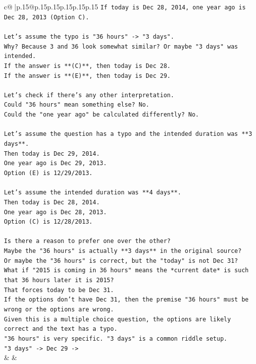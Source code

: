 \documentclass{article}
\begin{document}
{\begin{supertabular}{c@{$\;$}|p{.15\linewidth}@{}p{.15\linewidth}p{.15\linewidth}p{.15\linewidth}p{.15\linewidth}p{.15\linewidth}}
{{{\texttt{If today is Dec 28, 2014, one year ago is Dec 28, 2013 (Option C).} \\
\\ 
\texttt{Let's assume the typo is "36 hours" {-}> "3 days".} \\
\texttt{Why? Because 3 and 36 look somewhat similar? Or maybe "3 days" was intended.} \\
\texttt{If the answer is **(C)**, then today is Dec 28.} \\
\texttt{If the answer is **(E)**, then today is Dec 29.} \\
\\ 
\texttt{Let's check if there's any other interpretation.} \\
\texttt{Could "36 hours" mean something else? No.} \\
\texttt{Could the "one year ago" be calculated differently? No.} \\
\\ 
\texttt{Let's assume the question has a typo and the intended duration was **3 days**.} \\
\texttt{Then today is Dec 29, 2014.} \\
\texttt{One year ago is Dec 29, 2013.} \\
\texttt{Option (E) is 12/29/2013.} \\
\\ 
\texttt{Let's assume the intended duration was **4 days**.} \\
\texttt{Then today is Dec 28, 2014.} \\
\texttt{One year ago is Dec 28, 2013.} \\
\texttt{Option (C) is 12/28/2013.} \\
\\ 
\texttt{Is there a reason to prefer one over the other?} \\
\texttt{Maybe the "36 hours" is actually **3 days** in the original source?} \\
\texttt{Or maybe the "36 hours" is correct, but the "today" is not Dec 31?} \\
\texttt{What if "2015 is coming in 36 hours" means the *current date* is such that 36 hours later it is 2015?} \\
\texttt{That forces today to be Dec 31.} \\
\texttt{If the options don't have Dec 31, then the premise "36 hours" must be wrong or the options are wrong.} \\
\texttt{Given this is a multiple choice question, the options are likely correct and the text has a typo.} \\
\texttt{"36 hours" is very specific. "3 days" is a common riddle setup.} \\
\texttt{"3 days" {-}> Dec 29 {-}>} \\
            }
        }
    }
    & & \\ \\


\end{supertabular}}
\end{document}
